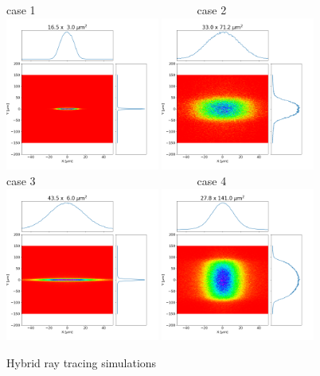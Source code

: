 \documentclass{iucr}              %
\begin{document}
\begin{figure}
    \label{fig:hybrid}
    \centering
    case 1~~~~~~~~~~~~~~~~~~~~~~~~~~~~~case 2\\
    \includegraphics[width=0.45\textwidth]{figures/case1_hybrid.png}
    \includegraphics[width=0.45\textwidth]{figures/case2_hybrid.png}\\
    case 3~~~~~~~~~~~~~~~~~~~~~~~~~~~~~case 4\\
    \includegraphics[width=0.45\textwidth]{figures/case3_hybrid.png}
    \includegraphics[width=0.45\textwidth]{figures/case4_hybrid.png}
    \caption{Hybrid ray tracing simulations}
\end{figure}
\end{document}
